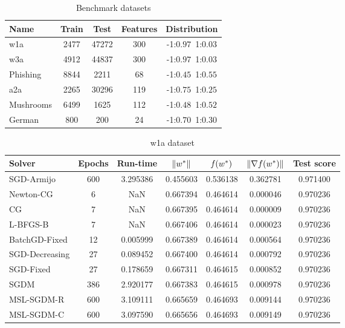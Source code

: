\begin{table}
\centering
\caption{Benchmark datasets}
\label{tab:datasets}
\begin{tabular}{lSSSc}
\toprule
Name & {Train} & {Test} & {Features} & {Distribution} \\
\midrule
w1a & 2477 & 47272 & 300 & -1:$0.97$\,\,\,1:$0.03$ \\
w3a & 4912 & 44837 & 300 & -1:$0.97$\,\,\,1:$0.03$ \\
Phishing & 8844 & 2211 & 68 & -1:$0.45$\,\,\,1:$0.55$ \\
a2a & 2265 & 30296 & 119 & -1:$0.75$\,\,\,1:$0.25$ \\
Mushrooms & 6499 & 1625 & 112 & -1:$0.48$\,\,\,1:$0.52$ \\
German & 800 & 200 & 24 & -1:$0.70$\,\,\,1:$0.30$ \\
\bottomrule
\end{tabular}
\end{table}

\cleardoublepage

\begin{table}
\centering
\caption{w1a dataset}
\label{tab:w1a-table}
\begin{tabular}{lS[drop-zero-decimal]S[round-precision=4]S[round-precision=6]S[round-precision=6]S[exponent-mode=scientific]S[round-precision=6]}
\toprule
Solver & {Epochs} & {Run-time} & {$\lVert w^\ast\rVert$} & {$\operatorname*{\mathit{f}}(w^\ast)$} & {$\lVert\nabla f(w^\ast)\rVert$} & {Test score} \\
\midrule
SGD-Armijo & 600 & 3.295386 & 0.455603 & 0.536138 & 0.362781 & 0.971400 \\
Newton-CG & 6 & NaN & 0.667394 & 0.464614 & 0.000046 & 0.970236 \\
CG & 7 & NaN & 0.667395 & 0.464614 & 0.000009 & 0.970236 \\
L-BFGS-B & 7 & NaN & 0.667406 & 0.464614 & 0.000023 & 0.970236 \\
BatchGD-Fixed & 12 & 0.005999 & 0.667389 & 0.464614 & 0.000564 & 0.970236 \\
SGD-Decreasing & 27 & 0.089452 & 0.667400 & 0.464614 & 0.000792 & 0.970236 \\
SGD-Fixed & 27 & 0.178659 & 0.667311 & 0.464615 & 0.000852 & 0.970236 \\
SGDM & 386 & 2.920177 & 0.667383 & 0.464615 & 0.000978 & 0.970236 \\
MSL-SGDM-R & 600 & 3.109111 & 0.665659 & 0.464693 & 0.009144 & 0.970236 \\
MSL-SGDM-C & 600 & 3.097590 & 0.665656 & 0.464693 & 0.009149 & 0.970236 \\
\bottomrule
\end{tabular}
\end{table}

